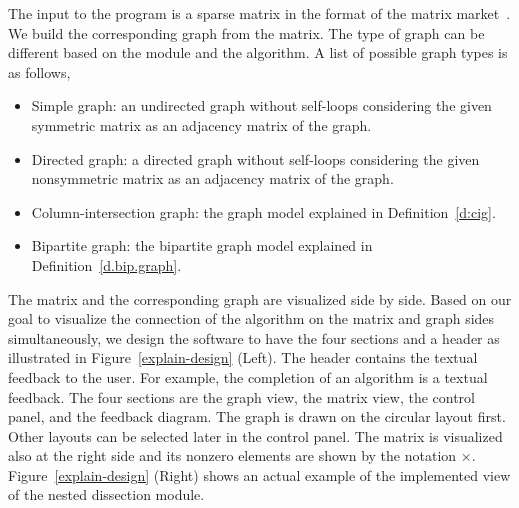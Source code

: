 \documentclass[12pt, twoside,a4paper,toc=bibliography]{scrbook}
\newcommand{\figref}[1]{Figure~\protect\ref{#1}}
\newcommand{\defref}[1]{Definition~\protect\ref{#1}}
\begin{document}
The input to the program is a sparse matrix in the format of the matrix market~\cite{matrix-market}.
We build the corresponding graph from the matrix.
The type of graph can be different based on the module and the algorithm.
A list of possible graph types is as follows,
\begin{itemize}
\item Simple graph: an undirected graph without self-loops considering 
the given symmetric matrix as an adjacency matrix of the graph.
\item Directed graph: a directed graph without self-loops considering
the given nonsymmetric matrix as an adjacency matrix of the graph.
\item Column-intersection graph: the graph model explained in \defref{d:cig}.
\item Bipartite graph: the bipartite graph model explained in \defref{d.bip.graph}.
\end{itemize}
The matrix and the corresponding graph are visualized side by side.
Based on our goal to visualize the connection of the algorithm on the matrix and graph sides simultaneously,
we design the software to have the four sections and a header as illustrated in \figref{explain-design} (Left).
The header contains the textual feedback to the user. For example, the completion of an algorithm is a textual feedback. 
The four sections are the graph view, the matrix view, the control panel, and the feedback diagram.
The graph is drawn on the circular layout first. Other layouts can be selected later
in the control panel. The matrix is visualized also at the right side and
its nonzero elements are shown by the notation $\times$.
\figref{explain-design} (Right) shows an actual example of the implemented view of
the nested dissection module.
\end{document}
